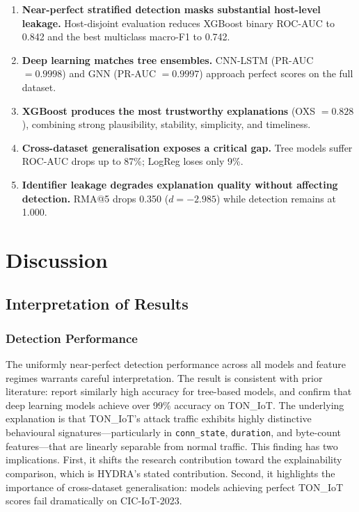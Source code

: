 \documentclass[12pt,a4paper]{report}
\begin{document}
\begin{enumerate}
  \item \textbf{Near-perfect stratified detection masks substantial host-level leakage.} Host-disjoint evaluation reduces XGBoost binary ROC-AUC to 0.842 and the best multiclass macro-F1 to 0.742.
  \item \textbf{Deep learning matches tree ensembles.} CNN-LSTM (PR-AUC $= 0.9998$) and GNN (PR-AUC $= 0.9997$) approach perfect scores on the full dataset.
  \item \textbf{XGBoost produces the most trustworthy explanations} (OXS $= 0.828$), combining strong plausibility, stability, simplicity, and timeliness.
  \item \textbf{Cross-dataset generalisation exposes a critical gap.} Tree models suffer ROC-AUC drops up to 87\%; LogReg loses only 9\%.
  \item \textbf{Identifier leakage degrades explanation quality without affecting detection.} RMA@5 drops 0.350 ($d = -2.985$) while detection remains at 1.000.
\end{enumerate}

\chapter{Discussion}
\label{ch:discussion}

\section{Interpretation of Results}
\label{sec:interpretation}

\subsection{Detection Performance}
\label{sec:disc-detection}

The uniformly near-perfect detection performance across all models and feature regimes warrants careful interpretation. The result is consistent with prior literature: \cite{alsaedi2020} report similarly high accuracy for tree-based models, and \cite{tareq2022} confirm that deep learning models achieve over 99\% accuracy on TON\_IoT. The underlying explanation is that TON\_IoT's attack traffic exhibits highly distinctive behavioural signatures---particularly in \texttt{conn\_state}, \texttt{duration}, and byte-count features---that are linearly separable from normal traffic. This finding has two implications. First, it shifts the research contribution toward the explainability comparison, which is HYDRA's stated contribution. Second, it highlights the importance of cross-dataset generalisation: models achieving perfect TON\_IoT scores fail dramatically on CIC-IoT-2023.
\end{document}
